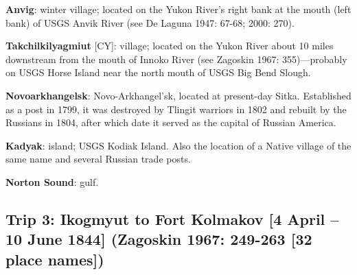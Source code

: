 \begin{hang}
\textbf{Anvig}: winter village; located on the Yukon River’s right bank at the mouth (left bank) of USGS Anvik River (see De Laguna 1947: 67-68; 2000: 270).



\textbf{Takchilkilyagmiut} [CY]: village; located on the Yukon River about 10 miles downstream from the mouth of Innoko River (see Zagoskin 1967: 355)—probably on USGS Horse Island near the north mouth of USGS Big Bend Slough.



\textbf{Novoarkhangelsk}: Novo-Arkhangel’sk, located at present-day Sitka. Established as a post in 1799, it was destroyed by Tlingit warriors in 1802 and rebuilt by the Russians in 1804, after which date it served as the capital of Russian America.



\textbf{Kadyak}: island; USGS Kodiak Island. Also the location of a Native village of the same name and several Russian trade posts.



\textbf{Norton Sound}: gulf.

\end{hang}


\subsection*{Trip 3: Ikogmyut to Fort Kolmakov [4 April – 10 June 1844]   (Zagoskin 1967: 249-263 [32 place names]) }
\ \\
\ \\

